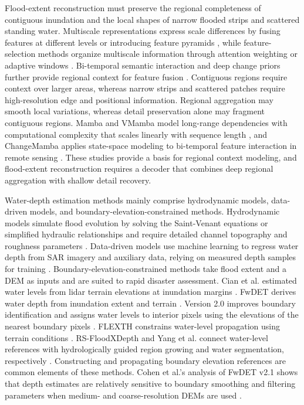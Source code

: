 \documentclass[authoryear,preprint,12pt]{elsarticle}
\begin{document}
Flood-extent reconstruction must preserve the regional completeness of contiguous inundation and the local shapes of narrow flooded strips and scattered standing water. Multiscale representations express scale differences by fusing features at different levels or introducing feature pyramids \citep{wu2022msdeeplab,zhao2023siamdwenet,tahermanesh2025siscnet}, while feature-selection methods organize multiscale information through attention weighting or adaptive windows \citep{yadav2022attentive,zhu2025globalfloodsar}. Bi-temporal semantic interaction and deep change priors further provide regional context for feature fusion \citep{chen2021remote,han2023change}. Contiguous regions require context over larger areas, whereas narrow strips and scattered patches require high-resolution edge and positional information. Regional aggregation may smooth local variations, whereas detail preservation alone may fragment contiguous regions. Mamba and VMamba model long-range dependencies with computational complexity that scales linearly with sequence length \citep{gu2023mamba,liu2024vmamba}, and ChangeMamba applies state-space modeling to bi-temporal feature interaction in remote sensing \citep{chen2024changemamba}. These studies provide a basis for regional context modeling, and flood-extent reconstruction requires a decoder that combines deep regional aggregation with shallow detail recovery.

Water-depth estimation methods mainly comprise hydrodynamic models, data-driven models, and boundary-elevation-constrained methods. Hydrodynamic models simulate flood evolution by solving the Saint-Venant equations or simplified hydraulic relationships and require detailed channel topography and roughness parameters \citep{teng2017floodInundationUncertainty}. Data-driven models use machine learning to regress water depth from SAR imagery and auxiliary data, relying on measured depth samples for training \citep{chu2025urbanDepth}. Boundary-elevation-constrained methods take flood extent and a DEM as inputs and are suited to rapid disaster assessment. Cian et al. estimated water levels from lidar terrain elevations at inundation margins \citep{cian2018flood}. FwDET derives water depth from inundation extent and terrain \citep{cohen2018estimating}. Version 2.0 improves boundary identification and assigns water levels to interior pixels using the elevations of the nearest boundary pixels \citep{cohen2019floodwater}. FLEXTH constrains water-level propagation using terrain conditions \citep{betterle2024water}. RS-FloodXDepth and Yang et al. connect water-level references with hydrologically guided region growing and water segmentation, respectively \citep{tian2026floodxdepth,yang2026csmamba}. Constructing and propagating boundary elevation references are common elements of these methods. Cohen et al.'s analysis of FwDET v2.1 shows that depth estimates are relatively sensitive to boundary smoothing and filtering parameters when medium- and coarse-resolution DEMs are used \citep{cohen2022sensitivity}.
\end{document}
